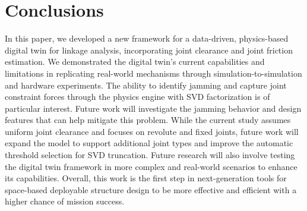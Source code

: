 \section{Conclusions} \label{conclusion}
In this paper, we developed a new framework for a data-driven, physics-based digital twin for linkage analysis, incorporating joint clearance and joint friction estimation. We demonstrated the digital twin's current capabilities and limitations in replicating real-world mechanisms through simulation-to-simulation and hardware experiments. The ability to identify jamming and capture joint constraint forces through the physics engine with SVD factorization is of particular interest. Future work will investigate the jamming behavior and design features that can help mitigate this problem. While the current study assumes uniform joint clearance and focuses on revolute and fixed joints, future work will expand the model to support additional joint types and improve the automatic threshold selection for SVD truncation. Future research will also involve testing the digital twin framework in more complex and real-world scenarios to enhance its capabilities. Overall, this work is the first step in next-generation tools for space-based deployable structure design to be more effective and efficient with a higher chance of mission success.